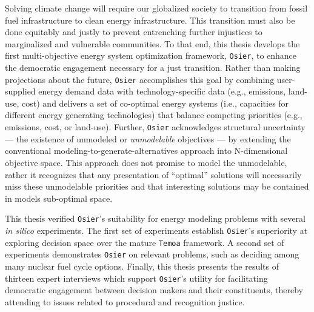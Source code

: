 Solving climate change will require our globalized society to transition from
fossil fuel infrastructure to clean energy infrastructure. This transition must
also be done equitably and justly to prevent entrenching further injustices to
marginalized and vulnerable communities. To that end, this thesis develops the
first multi-objective energy system optimization framework, \texttt{Osier}, to
enhance the democratic engagement necessary for a just transition. Rather than
making projections about the future, \texttt{Osier} accomplishes this goal by
combining user-supplied energy demand data with technology-specific data (e.g.,
emissions, land-use, cost) and delivers a set of co-optimal energy systems
(i.e., capacities for different energy generating technologies) that balance
competing priorities (e.g., emissions, cost, or land-use). Further,
\texttt{Osier} acknowledges structural uncertainty --- the existence of
unmodeled or \textit{unmodelable} objectives --- by extending the conventional
modeling-to-generate-alternatives approach into N-dimensional objective space.
This approach does not promise to model the unmodelable, rather it recognizes
that any presentation of ``optimal'' solutions will necessarily miss these
unmodelable priorities and that interesting solutions may be contained in
models sub-optimal space.

This thesis verified \texttt{Osier}'s suitability for energy modeling problems
with several \textit{in silico} experiments. The first set of experiments
establish \texttt{Osier}'s superiority at exploring decision space over the
mature \texttt{Temoa} framework. A second set of experiments demonstrates
\texttt{Osier} on relevant problems, such as deciding among many nuclear fuel
cycle options. Finally, this thesis presents the results of thirteen expert
interviews which support \texttt{Osier}'s utility for facilitating democratic
engagement between decision makers and their constituents, thereby attending
to issues related to procedural and recognition justice.